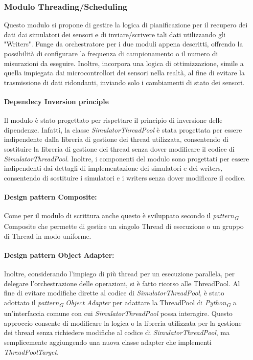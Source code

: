 \begin{itemize}
\subsubsection{Modulo Threading/Scheduling}
Questo modulo si propone di gestire la logica di pianificazione per il recupero dei dati dai simulatori dei sensori e di inviare/scrivere tali dati utilizzando gli "Writers". Funge da orchestratore per i due moduli appena descritti, offrendo la possibilità di configurare la frequenza di campionamento o il numero di misurazioni da eseguire. Inoltre, incorpora una logica di ottimizzazione, simile a quella impiegata dai microcontrollori dei sensori nella realtà, al fine di evitare la trasmissione di dati ridondanti, inviando solo i cambiamenti di stato dei sensori.

\paragraph*{Dependecy Inversion principle}
Il modulo è stato progettato per rispettare il principio di inversione delle dipendenze. Infatti, la classe \textit{SimulatorThreadPool} è stata progettata per essere indipendente dalla libreria di gestione dei thread utilizzata, consentendo di sostituire la libreria di gestione dei thread senza dover modificare il codice di \textit{SimulatorThreadPool}.
Inoltre, i componenti del modulo sono progettati per essere indipendenti dai dettagli di implementazione dei simulatori e dei writers, consentendo di sostituire i simulatori e i writers senza dover modificare il codice.

\paragraph{Design pattern Composite:}
Come per il modulo di scrittura anche questo è sviluppato secondo il \textit{pattern}\textsubscript{\textit{G}} Composite che permette di gestire un singolo Thread di esecuzione o un gruppo di Thread in modo uniforme.
\paragraph{Design pattern Object Adapter:}
Inoltre, considerando l'impiego di più thread per un esecuzione parallela, per delegare l'orchestrazione delle operazioni, si è fatto ricorso alle ThreadPool. Al fine di evitare modifiche dirette al codice di \textit{SimulatorThreadPool}, è stato adottato il \textit{pattern}\textsubscript{\textit{G}} \textit{Object Adapter} per adattare la ThreadPool di \textit{Python}\textsubscript{\textit{G}} a un'interfaccia comune con cui \textit{SimulatorThreadPool} possa interagire. Questo approccio consente di modificare la logica o la libreria utilizzata per la gestione dei thread senza richiedere modifiche al codice di \textit{SimulatorThreadPool}, ma semplicemente aggiungendo una nuova classe adapter che implementi \textit{ThreadPoolTarget}.



\end{itemize}
